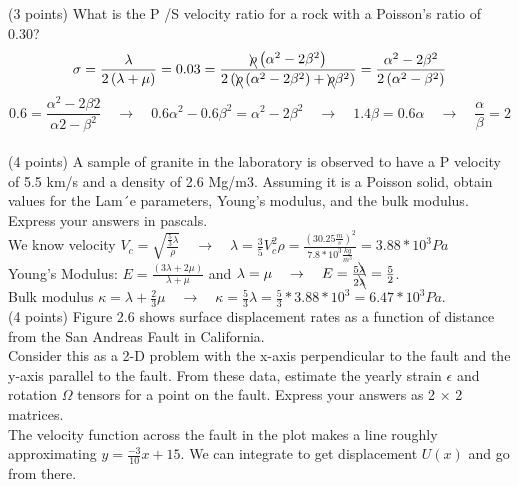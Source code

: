 \documentclass{article}
\begin{document}
(3 points) What is the P /S velocity ratio for a rock with a Poisson’s ratio of 0.30?\\
\[
\sigma = \frac{ \lambda } { 2 \left( \lambda + \mu \right) } = 0.03 = \frac { \bcancel{\rho} \left( \alpha^{2} - 2\beta^{2} \right)} { 2 \left( \bcancel{\rho} \left(  \alpha^{2} - 2\beta^{2} \right) + \bcancel{\rho}\beta^{2} \right)} = \frac{ \alpha^{2} - 2\beta^{2} } { 2 \left( \alpha^{2} - \beta^{2} \right) }
\]
\[
0.6 = \frac{ \alpha^{2} - 2\beta{2} } {\alpha{2} - \beta^{2} } \quad \rightarrow \quad 0.6\alpha^{2} - 0.6\beta^{2} = \alpha^{2} - 2\beta^{2} \quad \rightarrow \quad 1.4\beta = 0.6\alpha \quad \rightarrow \quad \frac{ \alpha } { \beta } = 2
\]\\
(4 points) A sample of granite in the laboratory is observed to have a P velocity of 5.5 km/s and a density of 2.6 Mg/m3. Assuming it is a Poisson solid, obtain values for the Lam´e parameters, Young’s modulus, and the bulk modulus. Express your answers in pascals.\\

We know velocity $V_c = \sqrt{ \frac{ \frac{5}{3} \lambda }{\rho} } \quad \rightarrow \quad \lambda = \frac{3}{5} V_c^{2} \rho = \frac{ \left( 30.25 \frac{m}{s} \right)^{2}}{7.8 * 10^{3} \frac{kg}{m^{3}} } = 3.88 * 10^{3} Pa$\\


Young's Modulus: $E = \frac{ \left( 3 \lambda + 2 \mu \right) }{\lambda + \mu}$ and $ \lambda = \mu \quad \rightarrow \quad E = \frac{5 \bcancel{\lambda}}{2\bcancel{\lambda}} = \frac{5}{2}$.\\

Bulk modulus $\kappa = \lambda + \frac{2}{3}\mu \quad \rightarrow \quad \kappa = \frac{5}{3}\lambda = \frac{5}{3} * 3.88 *10^{3} = 6.47 * 10^{3} Pa.$\\

(4 points) Figure 2.6 shows surface displacement rates as a function of distance from the San Andreas Fault in California.\\
 

Consider this as a 2-D problem with the x-axis perpendicular to the fault and the y-axis parallel to the fault. From these data, estimate the yearly strain $\epsilon$ and rotation $\Omega$ tensors for a point on the fault. Express your answers as 2 × 2 matrices.\\

The velocity function across the fault in the plot makes a line roughly approximating $y = \frac{-3}{10}x + 15$. We can integrate to get displacement $U\left(x\right)$ and go from there.
\end{document}
